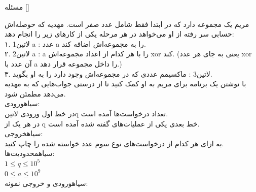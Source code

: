 

‌مسئله []

مریم یک مجموعه دارد که در ابتدا فقط شامل عدد صفر است. مهدیه که حوصله‌اش حسابی سر رفته از او می‌خواهد در هر مرحله یکی از کارهای زیر را انجام دهد: \\
۱. ‌لاتین{1 a} : عدد a را به مجموعه‌اش اضافه کند.\\
۲. ‌لاتین{2 a} : a را با هر کدام از اعداد مجموعه‌اش xor کند. (یعنی به جای هر عدد xor آن عدد با a را داخل مجموعه قرار دهد.)\\
۳. ‌لاتین{3} : ماکسیمم عددی که در مجموعه‌اش وجود دارد را به او بگوید.\\
با نوشتن یک برنامه برای مریم به او کمک کنید تا از درستی جواب‌هایی که به مهدیه می‌دهد مطمئن شود.\\

‌سیاه{ورودی:}\\
در خط اول ورودی ‌لاتین{q} تعداد درخواست‌ها آمده است.\\
در هر یک از q خط بعدی یکی از عملیات‌های گفته شده آمده است.\\

‌سیاه{خروجی:}\\
به ازای هر کدام از درخواست‌های نوع سوم عدد خواسته شده را چاپ کنید.\\

‌سیاه{محدودیت‌ها:}\\
$1 \leq q \leq 10^{5}$\\
$0 \leq a \leq 10^{9}$\\

‌سیاه{ورودی و خروجی نمونه:}\\

